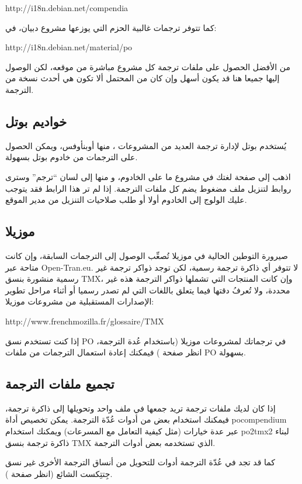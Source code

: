 http://i18n.debian.net/compendia

كما تتوفر ترجمات غالبية الحزم التي يوزعها مشروع دبيان، في:

http://i18n.debian.net/material/po

من الأفضل الحصول على ملفات ترجمة كل مشروع مباشرة من موقعه، لكن الوصول
إليها جميعا هنا قد يكون أسهل وإن كان من المحتمل ألا تكون هي أحدث نسخة
من الترجمة.

\subsection{خواديم بوتل}
يُستخدم بوتل لإدارة ترجمة العديد من المشروعات ، منها أوبن​أوفس، ويمكن
الحصول على الترجمات من خادوم بوتل بسهولة.

اذهب إلى صفحة لغتك في مشروع ما على الخادوم، و منها إلى لسان “ترجم” وسترى
روابط لتنزيل ملف مضغوط يضم كل ملفات الترجمة. إذا لم تر هذا الرابط فقد
يتوجب عليك الولوج إلى الخادوم أولا أو طلب صلاحيات التنزيل من مدير
الموقع.

\subsection{موزيلا}
صيرورة التوطين الحالية في موزيلا تُصعِّب الوصول إلى الترجمات السابقة،
وإن كانت متاحة عبر Open-Tran.eu. لا تتوفر أي ذاكرة ترجمة رسمية، لكن
توجد ذواكر ترجمة غير رسمية منشورة بنسق TMX، وإن كانت المنتجات التي
تشملها ذواكر الترجمة هذه غير محددة، ولا تُعرفُ دقتها فيما يتعلق باللغات
التي لم تصدر رسميا أو أثناء مراحل تطوير الإصدارات المستقبلية من مشروعات
موزيلا:

http://www.frenchmozilla.fr/glossaire/TMX

إذا كنت تستخدم نسق PO في ترجماتك لمشروعات موزيلا (باستخدام عُدة الترجمة،
انظر صفحة ) فيمكنك إعادة استعمال الترجمات من
ملفات PO بسهولة.

\subsection{تجميع ملفات الترجمة}
إذا كان لديك ملفات ترجمة تريد جمعها في ملف واحد وتحويلها إلى ذاكرة
ترجمة، فيمكنك استخدام بعض من أدوات عُدّة الترجمة. يمكن تخصيص أداة
pocompendium عبر عدة خيارات (مثل كيفية التعامل مع المسرعات) ويمكنك
استخدام po2tmx2 لبناء ذاكرة ترجمة بنسق TMX الذي تستخدمه بعض أدوات
الترجمة.

كما قد تجد في عُدّة الترجمة أدوات للتحويل من أنساق الترجمة الأخرى غير
نسق جِتتِكست الشائع (انظر صفحة ).

